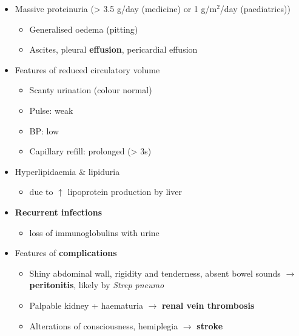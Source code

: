 \documentclass[
  12pt,
]{memoir}
\providecommand{\tightlist}{%
  \setlength{\itemsep}{0pt}\setlength{\parskip}{0pt}}
\begin{document}
\begin{itemize}
\tightlist
\item
  Massive proteinuria (\textgreater{} 3.5 g/day (medicine) or 1
  g/m\(^2\)/day (paediatrics))

  \begin{itemize}
  \tightlist
  \item
    Generalised oedema (pitting)
  \item
    Ascites, pleural \textbf{effusion}, pericardial effusion
  \end{itemize}
\item
  Features of reduced circulatory volume

  \begin{itemize}
  \tightlist
  \item
    Scanty urination (colour normal)
  \item
    Pulse: weak
  \item
    BP: low
  \item
    Capillary refill: prolonged (\textgreater{} 3s)
  \end{itemize}
\item
  Hyperlipidaemia \& lipiduria

  \begin{itemize}
  \tightlist
  \item
    due to \(\uparrow\) lipoprotein production by liver
  \end{itemize}
\item
  \textbf{Recurrent infections}

  \begin{itemize}
  \tightlist
  \item
    loss of immunoglobulins with urine
  \end{itemize}
\item
  Features of \textbf{complications}

  \begin{itemize}
  \tightlist
  \item
    Shiny abdominal wall, rigidity and tenderness, absent bowel sounds
    \(\rightarrow\) \textbf{peritonitis}, likely by \emph{Strep pneumo}
  \item
    Palpable kidney + haematuria \(\rightarrow\) \textbf{renal vein
    thrombosis}
  \item
    Alterations of consciousness, hemiplegia \(\rightarrow\)
    \textbf{stroke}
  \end{itemize}
\end{itemize}
\end{document}
